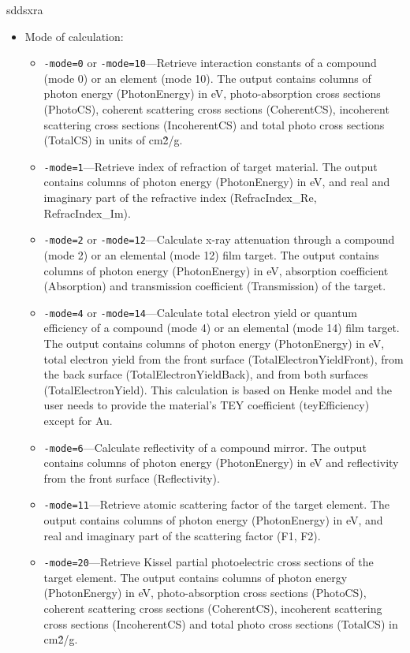 \begin{sddsprog}{sddsxra}
\begin{itemize}
  \item Mode of calculation:
    \begin{itemize}
      \item {\tt -mode=0} or {\tt -mode=10}---Retrieve interaction constants of a compound (mode 0) or an element (mode 10). The output contains columns of photon energy (PhotonEnergy) in eV, photo-absorption cross sections (PhotoCS), coherent scattering cross sections (CoherentCS), incoherent scattering cross sections (IncoherentCS) and total photo cross sections (TotalCS) in units of cm\^{2}/g.
      \item {\tt -mode=1}---Retrieve index of refraction of target material. The output contains columns of photon energy (PhotonEnergy) in eV, and real and imaginary part of the refractive index (RefracIndex\_Re, RefracIndex\_Im).
      \item {\tt -mode=2} or {\tt -mode=12}---Calculate x-ray attenuation through a compound (mode 2) or an elemental (mode 12) film target. The output contains columns of photon energy (PhotonEnergy) in eV, absorption coefficient (Absorption) and transmission coefficient (Transmission) of the target.
      \item {\tt -mode=4} or {\tt -mode=14}---Calculate total electron yield or quantum efficiency of a compound (mode 4) or an elemental (mode 14) film target. The output contains columns of photon energy (PhotonEnergy) in eV, total electron yield from the front surface (TotalElectronYieldFront), from the back surface (TotalElectronYieldBack), and from both surfaces (TotalElectronYield). This calculation is based on Henke model and the user needs to provide the material's TEY coefficient (teyEfficiency) except for Au.
      \item {\tt -mode=6}---Calculate reflectivity of a compound mirror. The output contains columns of photon energy (PhotonEnergy) in eV and reflectivity from the front surface (Reflectivity).
      \item {\tt -mode=11}---Retrieve atomic scattering factor of the target element. The output contains columns of photon energy (PhotonEnergy) in eV, and real and imaginary part of the scattering factor (F1, F2).
      \item {\tt -mode=20}---Retrieve Kissel partial photoelectric cross sections of the target element. The output contains columns of photon energy (PhotonEnergy) in eV, photo-absorption cross sections (PhotoCS), coherent scattering cross sections (CoherentCS), incoherent scattering cross sections (IncoherentCS) and total photo cross sections (TotalCS) in cm\^{2}/g.

\end{itemize}
\end{itemize}
\end{sddsprog}
